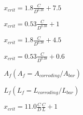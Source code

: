 \documentclass{article}
\begin{document}
\normalsize $ x_{crit} = 1.8 \frac{C}{D^{0.38}} + 7.5 $
\newline

\normalsize $ x_{crit} = 0.53 \frac{C}{D^{0.38}} + 1 $
\newline

\normalsize $ x_{crit} = 1.8 \frac{C}{D^{0.38}} + 4.5 $
\newline

\normalsize $ x_{crit} = 0.53 \frac{C}{D^{0.38}} + 0.6 $
\newline

\normalsize $ A_f(A_f = A_{corroding}/A_{bar}) $
\newline

\normalsize $ L_f(L_f = L_{corroding}/L_{bar}) $
\newline

\normalsize $ x_{crit} = 11.0 \frac{C}{D} \frac{C}{L} + 1 $
\newline
\end{document}
